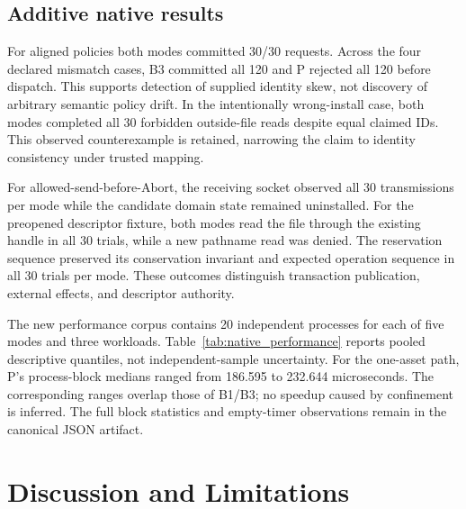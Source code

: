 \documentclass[electronics,article,submit,pdftex,moreauthors]{Definitions/mdpi}
\newcommand{\EvidenceDir}{../../results/204_Astra_review/generated}
\begin{document}
\subsection{Additive native results}
\begin{table}[H]\caption{Additional B3/P observations from the separately frozen revision source.}\centering\end{table}
For aligned policies both modes committed 30/30 requests. Across the four declared mismatch cases, B3 committed all 120 and P rejected all 120 before dispatch. This supports detection of supplied identity skew, not discovery of arbitrary semantic policy drift. In the intentionally wrong-install case, both modes completed all 30 forbidden outside-file reads despite equal claimed IDs. This observed counterexample is retained, narrowing the claim to identity consistency under trusted mapping.

For allowed-send-before-Abort, the receiving socket observed all 30 transmissions per mode while the candidate domain state remained uninstalled. For the preopened descriptor fixture, both modes read the file through the existing handle in all 30 trials, while a new pathname read was denied. The reservation sequence preserved its conservation invariant and expected operation sequence in all 30 trials per mode. These outcomes distinguish transaction publication, external effects, and descriptor authority.

The new performance corpus contains 20 independent processes for each of five modes and three workloads. Table~\ref{tab:native_performance} reports pooled descriptive quantiles, not independent-sample uncertainty. For the one-asset path, P's process-block medians ranged from 186.595 to 232.644 microseconds. The corresponding ranges overlap those of B1/B3; no speedup caused by confinement is inferred. The full block statistics and empty-timer observations remain in the canonical JSON artifact.
\begin{table}[H]\caption{New native timing summaries in microseconds, generated from raw samples. Each row represents 20 independent process blocks and 10,000 measured sequential operations.}\label{tab:native_performance}\centering

\end{table}

\section{Discussion and Limitations}\label{sec:discussion}
\end{document}
